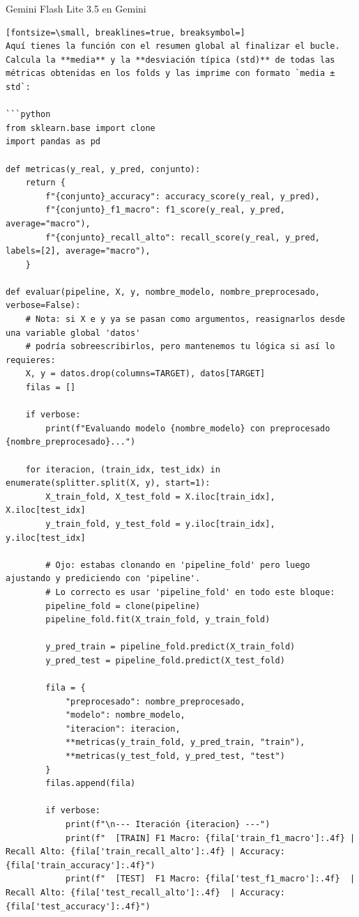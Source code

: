 \documentclass[12pt,a4paper,oneside]{book}
\begin{document}
\begin{iaresp}{Gemini Flash Lite 3.5 en Gemini}
\begin{Verbatim}[fontsize=\small, breaklines=true, breaksymbol=]
Aquí tienes la función con el resumen global al finalizar el bucle. Calcula la **media** y la **desviación típica (std)** de todas las métricas obtenidas en los folds y las imprime con formato `media ± std`:

```python
from sklearn.base import clone
import pandas as pd

def metricas(y_real, y_pred, conjunto):
    return {
        f"{conjunto}_accuracy": accuracy_score(y_real, y_pred),
        f"{conjunto}_f1_macro": f1_score(y_real, y_pred, average="macro"),
        f"{conjunto}_recall_alto": recall_score(y_real, y_pred, labels=[2], average="macro"),
    }

def evaluar(pipeline, X, y, nombre_modelo, nombre_preprocesado, verbose=False):
    # Nota: si X e y ya se pasan como argumentos, reasignarlos desde una variable global 'datos' 
    # podría sobreescribirlos, pero mantenemos tu lógica si así lo requieres:
    X, y = datos.drop(columns=TARGET), datos[TARGET]
    filas = []
    
    if verbose:
        print(f"Evaluando modelo {nombre_modelo} con preprocesado {nombre_preprocesado}...")
        
    for iteracion, (train_idx, test_idx) in enumerate(splitter.split(X, y), start=1):
        X_train_fold, X_test_fold = X.iloc[train_idx], X.iloc[test_idx]
        y_train_fold, y_test_fold = y.iloc[train_idx], y.iloc[test_idx]
        
        # Ojo: estabas clonando en 'pipeline_fold' pero luego ajustando y prediciendo con 'pipeline'.
        # Lo correcto es usar 'pipeline_fold' en todo este bloque:
        pipeline_fold = clone(pipeline)
        pipeline_fold.fit(X_train_fold, y_train_fold)
        
        y_pred_train = pipeline_fold.predict(X_train_fold)
        y_pred_test = pipeline_fold.predict(X_test_fold)
        
        fila = {
            "preprocesado": nombre_preprocesado,
            "modelo": nombre_modelo, 
            "iteracion": iteracion,
            **metricas(y_train_fold, y_pred_train, "train"),
            **metricas(y_test_fold, y_pred_test, "test")
        }
        filas.append(fila)
        
        if verbose:
            print(f"\n--- Iteración {iteracion} ---")
            print(f"  [TRAIN] F1 Macro: {fila['train_f1_macro']:.4f} | Recall Alto: {fila['train_recall_alto']:.4f} | Accuracy: {fila['train_accuracy']:.4f}")
            print(f"  [TEST]  F1 Macro: {fila['test_f1_macro']:.4f}  | Recall Alto: {fila['test_recall_alto']:.4f}  | Accuracy: {fila['test_accuracy']:.4f}")
            

\end{Verbatim}
\end{iaresp}
\end{document}
